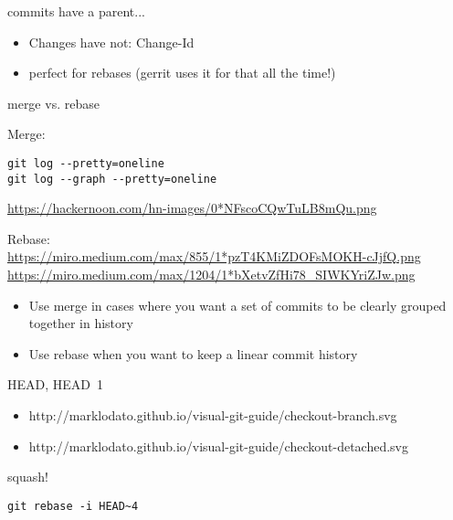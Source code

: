 \documentclass[landscape]{slides}
\begin{document}
\begin{slide}
commits have a parent...

\begin{itemize}
\item{} Changes have not: Change-Id
\item{} perfect for rebases (gerrit uses it for that all the time!)
\end{itemize}
\end{slide}

\begin{slide}
merge vs. rebase

Merge:
\begin{verbatim}
git log --pretty=oneline
git log --graph --pretty=oneline
\end{verbatim}
\url{https://hackernoon.com/hn-images/0*NFscoCQwTuLB8mQu.png}

Rebase: \\
\url{https://miro.medium.com/max/855/1*pzT4KMiZDOFsMOKH-cJjfQ.png} \\
\url{https://miro.medium.com/max/1204/1*bXetvZfHi78_SIWKYriZJw.png}

\begin{itemize}
\item{} Use merge in cases where you want a set of commits to be clearly grouped together in history
\item{} Use rebase when you want to keep a linear commit history
\end{itemize}
\end{slide}

\begin{slide}
HEAD, HEAD~1

\begin{itemize}
\item{} http://marklodato.github.io/visual-git-guide/checkout-branch.svg
\item{} http://marklodato.github.io/visual-git-guide/checkout-detached.svg
\end{itemize}
\end{slide}

\begin{slide}
squash!

\begin{verbatim}
git rebase -i HEAD~4
\end{verbatim}
\end{slide}
\end{document}
